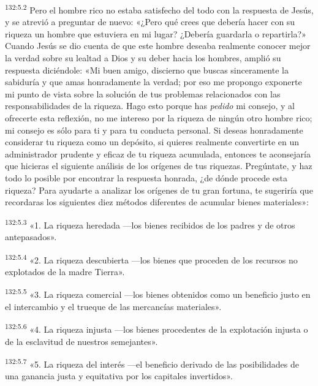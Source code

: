 \par
\textsuperscript{132:5.2} Pero el hombre rico no estaba satisfecho del todo con la respuesta de Jesús, y se atrevió a preguntar de nuevo: «¿Pero qué crees que debería hacer con su riqueza un hombre que estuviera en mi lugar? ¿Debería guardarla o repartirla?» Cuando Jesús se dio cuenta de que este hombre deseaba realmente conocer mejor la verdad sobre su lealtad a Dios y su deber hacia los hombres, amplió su respuesta diciéndole: «Mi buen amigo, discierno que buscas sinceramente la sabiduría y que amas honradamente la verdad; por eso me propongo exponerte mi punto de vista sobre la solución de tus problemas relacionados con las responsabilidades de la riqueza. Hago esto porque has \textit{pedido} mi consejo, y al ofrecerte esta reflexión, no me intereso por la riqueza de ningún otro hombre rico; mi consejo es sólo para ti y para tu conducta personal. Si deseas honradamente considerar tu riqueza como un depósito, si quieres realmente convertirte en un administrador prudente y eficaz de tu riqueza acumulada, entonces te aconsejaría que hicieras el siguiente análisis de los orígenes de tus riquezas. Pregúntate, y haz todo lo posible por encontrar la respuesta honrada, ¿de dónde procede esta riqueza? Para ayudarte a analizar los orígenes de tu gran fortuna, te sugeriría que recordaras los siguientes diez métodos diferentes de acumular bienes materiales»:

\par
\textsuperscript{132:5.3} «1. La riqueza heredada ---los bienes recibidos de los padres y de otros antepasados».

\par
\textsuperscript{132:5.4} «2. La riqueza descubierta ---los bienes que proceden de los recursos no explotados de la madre Tierra».

\par
\textsuperscript{132:5.5} «3. La riqueza comercial ---los bienes obtenidos como un beneficio justo en el intercambio y el trueque de las mercancías materiales».

\par
\textsuperscript{132:5.6} «4. La riqueza injusta ---los bienes procedentes de la explotación injusta o de la esclavitud de nuestros semejantes».

\par
\textsuperscript{132:5.7} «5. La riqueza del interés ---el beneficio derivado de las posibilidades de una ganancia justa y equitativa por los capitales invertidos».

